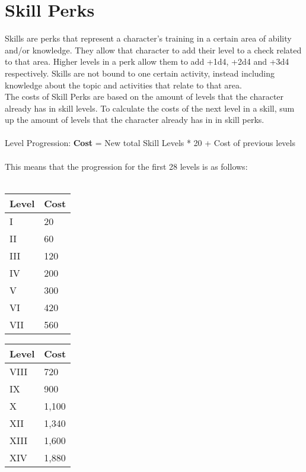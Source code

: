 \chapter{Skill Perks}\label{ch:skillPerks}
Skills are perks that represent a character's training in a certain area of ability and/or knowledge.
They allow that character to add their level to a check related to that area.
Higher levels in a perk allow them to add +1d4, +2d4 and +3d4 respectively.
Skills are not bound to one certain activity, instead including knowledge about the topic and activities that relate to that area.\\
The costs of Skill Perks are based on the amount of levels that the character already has in skill levels.
To calculate the costs of the next level in a skill, sum up the amount of levels that the character already has in in skill perks.\\
\\
Level Progression: \textbf{Cost} = New total Skill Levels * 20 + Cost of previous levels\\
\\
This means that the progression for the first 28 levels is as follows:\\
\\
\begin{minipage}{0.25\textwidth}
    \begin{tabular}{l | l}
        Level & Cost\\ \hline
        I & 20\\
        II & 60\\
        III & 120\\
        IV & 200\\
        V & 300\\
        VI & 420\\
        VII & 560\\
    \end{tabular}
\end{minipage}
\begin{minipage}{0.25\textwidth}
    \begin{tabular}{l | l}
        Level & Cost\\ \hline
        VIII & 720\\
        IX & 900\\
        X & 1,100\\
        XII & 1,340\\
        XIII & 1,600\\
        XIV & 1,880\\
    \end{tabular}
\end{minipage}
